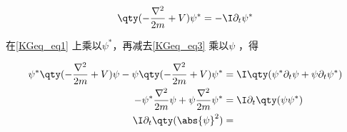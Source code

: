 \begin{equation}\label{KGeq_eq3}
\qty(-\frac{\nabla^2}{2m}+V)\psi^* = -\I \partial_t \psi^*
\end{equation}

在\autoref{KGeq_eq1} 上乘以$\psi^*$，再减去\autoref{KGeq_eq3} 乘以$\psi$ ，得

\begin{equation}
\begin{aligned}
\psi^*\qty(-\frac{\nabla^2}{2m}+V)\psi - \psi\qty(-\frac{\nabla^2}{2m}+V)\psi^* &= \I\qty(\psi^*\partial_t\psi + \psi\partial_t\psi^*)\\
-\psi^*\frac{\nabla^2}{2m}\psi + \psi\frac{\nabla^2}{2m}\psi^* &= \I \partial_t\qty(\psi\psi^*)\\
\I \partial_t\qty(\abs{\psi}^2) &= 
\end{aligned}
\end{equation}













